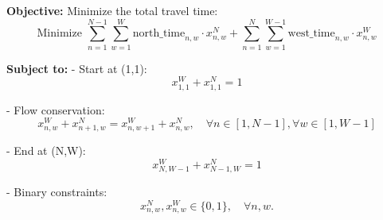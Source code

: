 \documentclass{article}
\begin{document}
\textbf{Objective:}
Minimize the total travel time:
\[
\text{Minimize } \sum_{n=1}^{N-1} \sum_{w=1}^{W} \text{north\_time}_{n,w} \cdot x_{n,w}^N + \sum_{n=1}^{N} \sum_{w=1}^{W-1} \text{west\_time}_{n,w} \cdot x_{n,w}^W
\]

\textbf{Subject to:}
- Start at (1,1):
\[
x_{1,1}^W + x_{1,1}^N = 1
\]

- Flow conservation:
\[
x_{n,w}^W + x_{n+1,w}^N = x_{n,w+1}^W + x_{n,w}^N, \quad \forall n \in [1, N-1], \forall w \in [1, W-1]
\]

- End at (N,W):
\[
x_{N,W-1}^W + x_{N-1, W}^N = 1
\]

- Binary constraints:
\[
x_{n,w}^N, x_{n,w}^W \in \{0, 1\}, \quad \forall n, w.
\]
\end{document}
